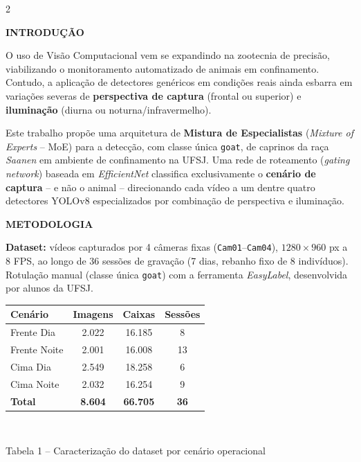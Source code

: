 \documentclass[a0,portrait]{a0poster}
\newcommand{\sectionfont}{\fontsize{34}{46}\selectfont\bfseries}
\newcommand{\bodyfont}{\fontsize{25}{31}\selectfont}
\begin{document}
\begin{multicols}{2}

{\sectionfont INTRODUÇÃO}

{\bodyfont
O uso de Visão Computacional vem se expandindo na zootecnia de precisão, viabilizando o monitoramento automatizado de animais em confinamento. Contudo, a aplicação de detectores genéricos em condições reais ainda esbarra em variações severas de \textbf{perspectiva de captura} (frontal ou superior) e \textbf{iluminação} (diurna ou noturna/infravermelho).

Este trabalho propõe uma arquitetura de \textbf{Mistura de Especialistas} (\textit{Mixture of Experts} -- MoE) para a detecção, com classe única \texttt{goat}, de caprinos da raça \textit{Saanen} em ambiente de confinamento na UFSJ. Uma rede de roteamento (\textit{gating network}) baseada em \textit{EfficientNet} classifica exclusivamente o \textbf{cenário de captura} -- e não o animal -- direcionando cada vídeo a um dentre quatro detectores YOLOv8 especializados por combinação de perspectiva e iluminação.
}

\vspace{1cm}

{\sectionfont METODOLOGIA}

{\bodyfont
\textbf{Dataset:} vídeos capturados por 4 câmeras fixas (\texttt{Cam01}--\texttt{Cam04}), $1280\times960$ px a 8 FPS, ao longo de 36 sessões de gravação (7 dias, rebanho fixo de 8 indivíduos). Rotulação manual (classe única \texttt{goat}) com a ferramenta \textit{EasyLabel}, desenvolvida por alunos da UFSJ.
}

\begin{center}
\begin{tabular}{|l|c|c|c|}
\hline
\textbf{Cenário} & \textbf{Imagens} & \textbf{Caixas} & \textbf{Sessões} \\
\hline
Frente Dia & 2.022 & 16.185 & 8 \\
Frente Noite & 2.001 & 16.008 & 13 \\
Cima Dia & 2.549 & 18.258 & 6 \\
Cima Noite & 2.032 & 16.254 & 9 \\
\hline
\textbf{Total} & \textbf{8.604} & \textbf{66.705} & \textbf{36} \\
\hline
\end{tabular}
\\{\footnotesize\centering Tabela 1 -- Caracterização do dataset por cenário operacional\par}
\end{center}


\end{multicols}
\end{document}
